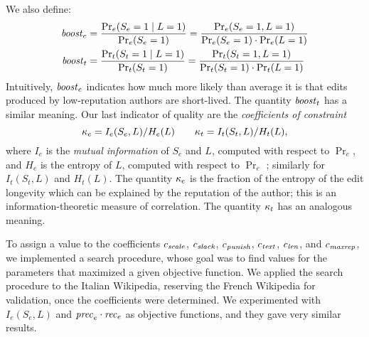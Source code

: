 We also define: 
%
\begin{align*}
  {\text{\textit{boost}}}_e & = \frac{\Pr_e(S_e=1 \mid L=1)}{\Pr_e(S_e=1)}
            = \frac{\Pr_e(S_e=1 , L=1)}{\Pr_e(S_e=1)\cdot\Pr_e(L=1)} \\
  {\text{\textit{boost}}}_t & = \frac{\Pr_t(S_t=1 \mid L=1)}{\Pr_t(S_t=1)}
            = \frac{\Pr_t(S_t=1 , L=1)}{\Pr_t(S_t=1)\cdot\Pr_t(L=1)}
\end{align*}
%
Intuitively, ${\text{\textit{boost}}}_e$ indicates how much more likely than average
it is that edits produced by low-reputation authors are short-lived.
The quantity ${\text{\textit{boost}}}_t$ has a similar meaning. 
Our last indicator of quality are the {\em coefficients of constraint\/}
\[ 
  \kappa_e = I_e(S_e,L) / H_e(L)
  \qquad 
  \kappa_t = I_t(S_t,L) / H_t(L),
\]
where $I_e$ is the {\em mutual information\/} of $S_e$ and $L$,
computed with respect to $\Pr_e$, and $H_e$ is the entropy of $L$,
computed with respect to $\Pr_e$ \cite{CoverBook}; similarly for
$I_t(S_t,L)$ and $H_t(L)$.
The quantity $\kappa_e$ is the fraction of the entropy of the
edit longevity which can be explained by the reputation of the author; 
this is an information-theoretic measure of correlation. 
The quantity $\kappa_t$ has an analogous meaning. 

To assign a value to the coefficients ${c_{{\text{\textit{scale}}}}}$, ${c_{{\text{\textit{slack}}}}}$,
${c_{{\text{\textit{punish}}}}}$, ${c_{{\text{\textit{text}}}}}$, ${c_{{\text{\textit{len}}}}}$, and ${c_{{\text{\textit{maxrep}}}}}$, 
we implemented a search procedure, whose goal was to find values for
the parameters that maximized a given objective function. 
We applied the search procedure to the Italian Wikipedia, reserving
the French Wikipedia for validation, once the coefficients were
determined. 
We experimented with $I_e(S_e,L)$ and ${\text{\textit{prec}}}_e \cdot {\text{\textit{rec}}}_e$
as objective functions, and they gave very similar results. 

